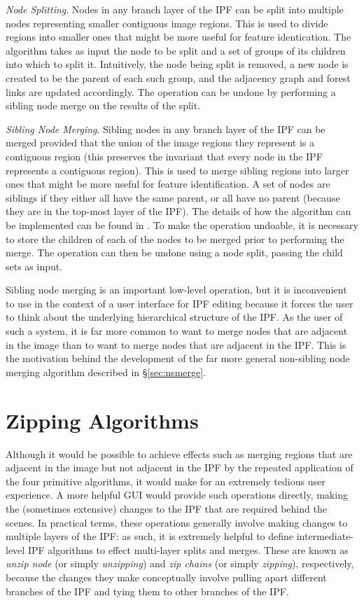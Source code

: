 \documentclass[10pt,twocolumn,twoside]{IEEEtran}
\begin{document}
\emph{Node Splitting}. Nodes in any branch layer of the IPF can be split into multiple nodes representing smaller contiguous image regions. This is used to divide regions into smaller ones that might be more useful for feature identication. The algorithm takes as input the node to be split and a set of groups of its children into which to split it. Intuitively, the node being split is removed, a new node is created to be the parent of each such group, and the adjacency graph and forest links are updated accordingly. The operation can be undone by performing a sibling node merge on the results of the split.

\emph{Sibling Node Merging}. Sibling nodes in any branch layer of the IPF can be merged provided that the union of the image regions they represent is a contiguous region (this preserves the invariant that every node in the IPF represents a contiguous region). This is used to merge sibling regions into larger ones that might be more useful for feature identification. A set of nodes are siblings if they either all have the same parent, or all have no parent (because they are in the top-most layer of the IPF). The details of how the algorithm can be implemented can be found in \cite{golodetz11}. To make the operation undoable, it is necessary to store the children of each of the nodes to be merged prior to performing the merge. The operation can then be undone using a node split, passing the child sets as input.

Sibling node merging is an important low-level operation, but it is inconvenient to use in the context of a user interface for IPF editing because it forces the user to think about the underlying hierarchical structure of the IPF. As the user of such a system, it is far more common to want to merge nodes that are adjacent in the image than to want to merge nodes that are adjacent in the IPF. This is the motivation behind the development of the far more general non-sibling node merging algorithm described in \S\ref{sec:nsmerge}.

\section{Zipping Algorithms}
\label{sec:zipping}

Although it would be possible to achieve effects such as merging regions that are adjacent in the image but not adjacent in the IPF by the repeated application of the four primitive algorithms, it would make for an extremely tedious user experience. A more helpful GUI would provide such operations directly, making the (sometimes extensive) changes to the IPF that are required behind the scenes. In practical terms, these operations generally involve making changes to multiple layers of the IPF: as such, it is extremely helpful to define intermediate-level IPF algorithms to effect multi-layer splits and merges. These are known as \emph{unzip node} (or simply \emph{unzipping}) and \emph{zip chains} (or simply \emph{zipping}), respectively, because the changes they make conceptually involve pulling apart different branches of the IPF and tying them to other branches of the IPF.
\end{document}
